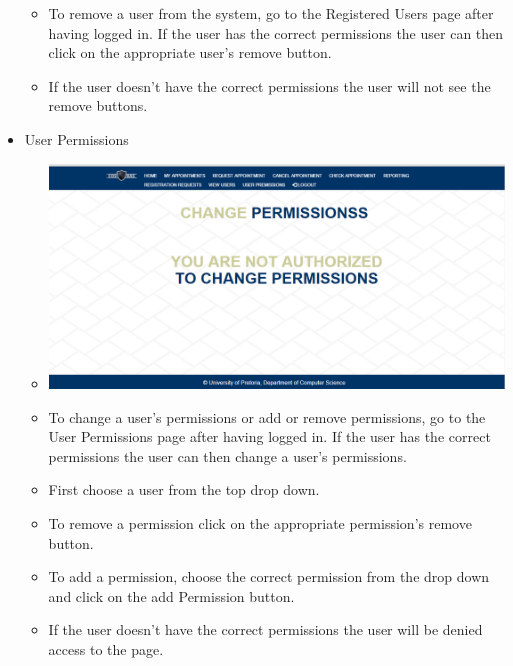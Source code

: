 \begin{itemize}
\begin{itemize}
				\item To remove a user from the system, go to the Registered Users page after having logged in. If the user has the correct permissions the user can then click on the appropriate user's remove button.
				\item If the user doesn't have the correct permissions the user will not see the remove buttons.
			\end{itemize}
		\item User Permissions
			\begin{itemize}
				\item \includegraphics[width=\linewidth]{images/Screenshots/ChangePermissions.png}
				\item To change a user's permissions or add or remove permissions, go to the User Permissions page after having logged in. If the user has the correct permissions the user can then change a user's permissions.
				\item First choose a user from the top drop down.
				\item To remove a permission click on the appropriate permission's remove button.
				\item To add a permission, choose the correct permission from the drop down and click on the add Permission button.
				\item If the user doesn't have the correct permissions the user will be denied access to the page.
			\end{itemize}
	\end{itemize}